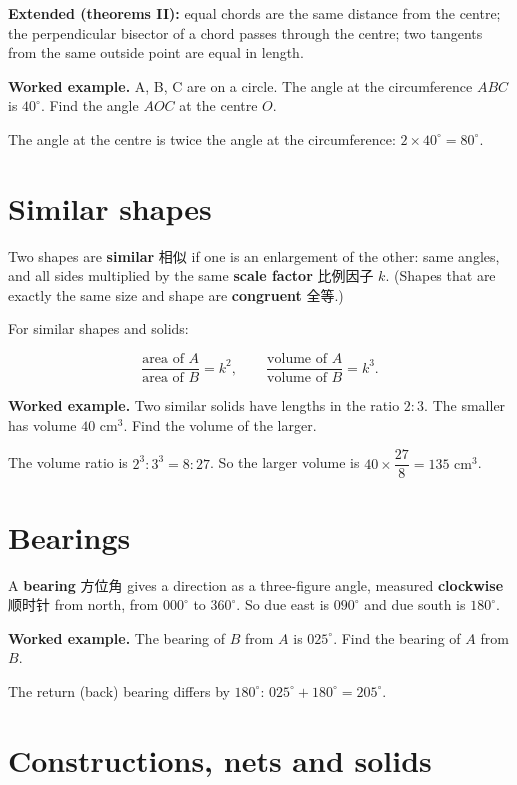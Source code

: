 \documentclass[11pt]{article}
\begin{document}
\textbf{Extended (theorems II):} equal chords are the same distance from the centre; the perpendicular bisector of a chord passes through the centre; two tangents from the same outside point are equal in length.

\textbf{Worked example.} A, B, C are on a circle. The angle at the circumference $ABC$ is $40^{\circ}$. Find the angle $AOC$ at the centre $O$.

The angle at the centre is twice the angle at the circumference: $2 \times 40^{\circ} = 80^{\circ}$.

\section*{Similar shapes}

Two shapes are \textbf{similar} 相似 if one is an enlargement of the other: same angles, and all sides multiplied by the same \textbf{scale factor} 比例因子 $k$. (Shapes that are exactly the same size and shape are \textbf{congruent} 全等.)

For similar shapes and solids:

\[
\frac{\text{area of } A}{\text{area of } B} = k^{2}, \qquad \frac{\text{volume of } A}{\text{volume of } B} = k^{3}.
\]

\textbf{Worked example.} Two similar solids have lengths in the ratio $2 : 3$. The smaller has volume $40\text{ cm}^{3}$. Find the volume of the larger.

The volume ratio is $2^{3} : 3^{3} = 8 : 27$. So the larger volume is $40 \times \dfrac{27}{8} = 135\text{ cm}^{3}$.

\section*{Bearings}

A \textbf{bearing} 方位角 gives a direction as a three-figure angle, measured \textbf{clockwise} 顺时针 from north, from $000^{\circ}$ to $360^{\circ}$. So due east is $090^{\circ}$ and due south is $180^{\circ}$.

\textbf{Worked example.} The bearing of $B$ from $A$ is $025^{\circ}$. Find the bearing of $A$ from $B$.

The return (back) bearing differs by $180^{\circ}$: $025^{\circ} + 180^{\circ} = 205^{\circ}$.

\section*{Constructions, nets and solids}
\end{document}
